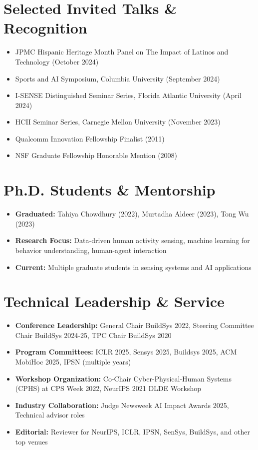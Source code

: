 \documentclass[11pt]{article}
\begin{document}
\section{Selected Invited Talks \& Recognition}
\begin{itemize}[topsep=1pt,itemsep=2pt]
    \item JPMC Hispanic Heritage Month Panel on The Impact of Latinos and Technology (October 2024)
    \item Sports and AI Symposium, Columbia University (September 2024)
    \item I-SENSE Distinguished Seminar Series, Florida Atlantic University (April 2024)
    \item HCII Seminar Series, Carnegie Mellon University (November 2023)
    \item Qualcomm Innovation Fellowship Finalist (2011)
    \item NSF Graduate Fellowship Honorable Mention (2008)
\end{itemize}

\section{Ph.D. Students \& Mentorship}
\begin{itemize}[topsep=1pt,itemsep=2pt]
    \item \textbf{Graduated:} Tahiya Chowdhury (2022), Murtadha Aldeer (2023), Tong Wu (2023)
    \item \textbf{Research Focus:} Data-driven human activity sensing, machine learning for behavior understanding, human-agent interaction
    \item \textbf{Current:} Multiple graduate students in sensing systems and AI applications
\end{itemize}

\section{Technical Leadership \& Service}
\begin{itemize}[topsep=1pt,itemsep=2pt]
    \item \textbf{Conference Leadership:} General Chair BuildSys 2022, Steering Committee Chair BuildSys 2024-25, TPC Chair BuildSys 2020
    \item \textbf{Program Committees:} ICLR 2025, Sensys 2025, Buildsys 2025, ACM MobiHoc 2025, IPSN (multiple years)
    \item \textbf{Workshop Organization:} Co-Chair Cyber-Physical-Human Systems (CPHS) at CPS Week 2022, NeurIPS 2021 DLDE Workshop
    \item \textbf{Industry Collaboration:} Judge Newsweek AI Impact Awards 2025, Technical advisor roles
    \item \textbf{Editorial:} Reviewer for NeurIPS, ICLR, IPSN, SenSys, BuildSys, and other top venues
\end{itemize}
\end{document}
